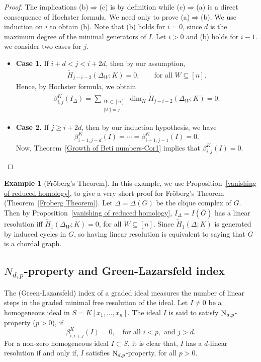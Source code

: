 \documentclass[a4paper,11pt]{amsart}
\theoremstyle{plain}
\theoremstyle{definition}
\newtheorem{ex}[thm]{Example}
\theoremstyle{remark}
\begin{document}
\begin{proof}
The implications (b)$\Rightarrow$(c) is by definition while (c)$\Rightarrow$(a) is a direct consequence of Hochster formula. We need only to prove (a)$\Rightarrow$(b). We use induction on $i$ to obtain (b). Note that (b) holds for $i=0$, since $d$ is the maximum degree of the minimal generators of $I$. Let $i>0$ and (b) holds for $i-1$. we consider two cases for $j$.
\begin{itemize}
\item[] \textbf{Case 1.} If $i+d < j < i+2d$, then by our assumption, 
\begin{align*}
\tilde{H}_{j-i-2} \left(\Delta_W; K \right) = 0, \qquad \text{for all } W \subseteq [n].
\end{align*}
Hence, by Hochster formula, we obtain
\begin{align*}
\beta^K_{i,j}(I_\Delta) = \sum\limits_{\substack{W \subset [n] \\ |W|=j}}{\dim_K \tilde{H}_{j-i-2}(\Delta_W; K)} =0.
\end{align*}

\item[] \textbf{Case 2.} If $j \geq i+2d$, then by our induction hypothesis, we have
$$\beta^K_{i-1,j-d} \left( I \right) = \cdots = \beta^K_{i-1,j-1} \left( I \right) = 0.$$
Now, Theorem~\ref{Growth of Beti numbers-Cor1} implies that $\beta^K_{i,j} \left( I \right) = 0$.
\end{itemize}
\end{proof}

\begin{ex}[Fr\"oberg's Theorem] \label{example for froberg}
In this example, we use Proposition~\ref{vanishing of reduced homology}, to give a very short proof for Fr\"oberg's Theorem (Theorem~\ref{Froberg Theorem}). Let $\Delta= \Delta(G)$ be the clique complex of $G$. Then by Proposition~\ref{vanishing of reduced homology}, $I_\Delta = I \left( \bar{G} \right)$ has a linear resolution iff $\tilde{H}_1 \left( \Delta_W; K \right) =0$, for all $W \subseteq [n]$. Since $\tilde{H}_1 \left( \Delta; K \right)$ is generated by induced cycles in $G$, so having linear resolution is equivalent to saying that $G$ is a chordal graph. 
\end{ex}

\subsection*{$N_{d,p}$-property and Green-Lazarsfeld index}
The (Green-Lazarsfeld) index of a graded ideal measures the number of linear steps in the graded minimal free resolution of the ideal. Let $I \neq 0$ be a homogeneous ideal in $S=K[x_1, \ldots, x_n]$. The ideal $I$ is said to satisfy ${\rm N}_{d,p}$-property ($p>0$), if
\begin{equation*}
\beta^K_{i, i+j} (I) =0, \quad \text{for all } i < p, \text{ and } j>d.
\end{equation*}
For a non-zero homogeneous ideal $I \subset S$, it is clear that, $I$ has a $d$-linear resolution if and only if, $I$ satisfies ${\rm N}_{d,p}$-property, for all $p > 0$.
\end{document}
